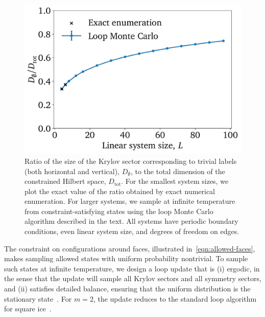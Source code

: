 \begin{figure}
    \centering
    \includegraphics[width=0.6\linewidth]{img/weak_ratio.pdf}
    \caption{Ratio of the size of the Krylov sector corresponding to trivial labels (both horizontal and vertical), $D_\emptyset$, to the total dimension of the constrained Hilbert space, $D_\text{tot}$. For the smallest system sizes, we plot the exact value of the ratio obtained by exact numerical enumeration. For larger systems, we sample at infinite temperature from constraint-satisfying states using the loop Monte Carlo algorithm described in the text. All systems have periodic boundary conditions, even linear system size, and degrees of freedom on edges.}
    \label{fig:weak-vs-strong}
\end{figure}


The constraint on configurations around faces, illustrated in~\eqref{eqn:allowed-faces}, makes sampling allowed states with uniform probability nontrivial.
To sample such states at infinite temperature, we design a loop update that is (i) ergodic, in the sense that the update will sample all Krylov sectors and all symmetry sectors, and (ii) satisfies detailed balance, ensuring that the uniform distribution is the stationary state~\cite{newman1999monte,levin2017markov}.
For $m=2$, the update reduces to the standard loop algorithm for square ice~\cite{BarkemaMonteCarlo}.

